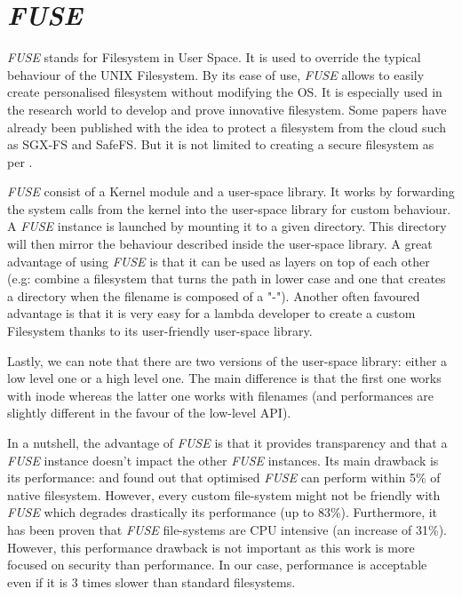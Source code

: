 \documentclass[../main.tex]{subfiles}
\begin{document}
\section{\textit{FUSE}}
\label{section:theoric:fuse}

\par \textit{FUSE} stands for Filesystem in User Space. It is used to override the typical behaviour of the UNIX Filesystem. By its ease of use, \textit{FUSE} allows to easily create personalised filesystem without modifying the OS. It is especially used in the research world to develop and prove innovative filesystem. Some papers have already been published with the idea to protect a filesystem from the cloud such as SGX-FS\cite{8590996} and SafeFS\cite{10.1145/3078468.3078480}. But it is not limited to creating a secure filesystem as per \cite{fuseExamples}.
\par \textit{FUSE} consist of a Kernel module and a user-space library. It works by forwarding the system calls from the kernel into the user-space library for custom behaviour. A \textit{FUSE} instance is launched by mounting it to a given directory. This directory will then mirror the behaviour described inside the user-space library. A great advantage of using \textit{FUSE} is that it can be used as layers on top of each other (e.g: combine a filesystem that turns the path in lower case and one that creates a directory when the filename is composed of a "-"). Another often favoured advantage is that it is very easy for a lambda developer to create a custom Filesystem thanks to its user-friendly user-space library.
\par Lastly, we can note that there are two versions of the user-space library: either a low level one or a high level one. The main difference is that the first one works with inode whereas the latter one works with filenames (and performances are slightly different in the favour of the low-level API).

\medbreak
\par In a nutshell, the advantage of \textit{FUSE} is that it provides transparency and that a \textit{FUSE} instance doesn't impact the other \textit{FUSE} instances. Its main drawback is its performance: \cite{vangoor2017fuse} and \cite{10.1145/1774088.1774130} found out that optimised \textit{FUSE} can perform within 5\% of native filesystem. However, every custom file-system might not be friendly with \textit{FUSE} which degrades drastically its performance (up to 83\%). Furthermore, it has been proven that \textit{FUSE} file-systems are CPU intensive (an increase of 31\%). However, this performance drawback is not important as this work is more focused on security than performance. In our case, performance is acceptable even if it is 3 times slower than standard filesystems.
\end{document}
